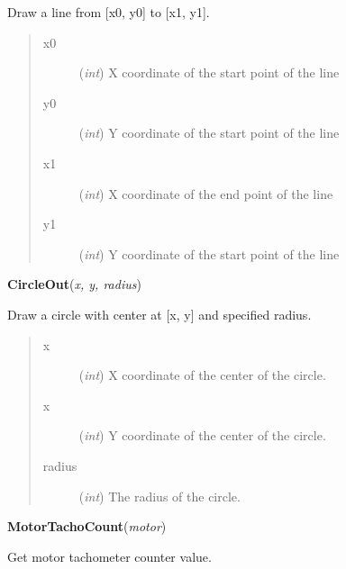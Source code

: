 \documentclass[10pt,a4paper]{article}
\begin{document}
    Draw a line from [x0, y0] to [x1, y1].





    

\begin{quote}
    \begin{description}
        
\item[x0] ({\emph{int}}) X coordinate of the start point of the line

\item[y0] ({\emph{int}}) Y coordinate of the start point of the line

\item[x1] ({\emph{int}}) X coordinate of the end point of the line

\item[y1] ({\emph{int}}) Y coordinate of the start point of the line

    \end{description}
\end{quote}

 

\vspace{6pt}
{\bf CircleOut}({\it x, y, radius}) 

    Draw a circle with center at [x, y] and specified radius.




    
    

\begin{quote}
    \begin{description}
        
\item[x] ({\emph{int}}) X coordinate of the center of the circle.

\item[x] ({\emph{int}}) Y coordinate of the center of the circle.

\item[radius] ({\emph{int}}) The radius of the circle.

    \end{description}
\end{quote}

 

\vspace{6pt}
{\bf MotorTachoCount}({\it motor}) 
    
    Get motor tachometer counter value.


    
\end{document}
